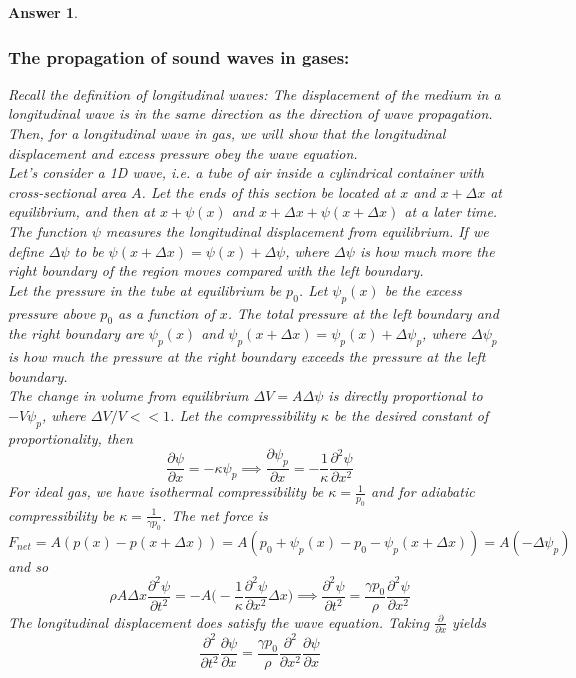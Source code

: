 \documentclass[a4paper]{article}
\newtheorem{ans}{Answer}[subsection]
\theoremstyle{new}
\begin{document}
\begin{ans}
\subsubsection*{The propagation of sound waves in gases:}
Recall the definition of longitudinal waves: The displacement of the medium in a longitudinal wave is in the same direction as the direction of wave propagation. Then, for a longitudinal wave in gas, we will show that the longitudinal displacement and excess pressure obey the wave equation.\\[5pt]
Let's consider a 1D wave, i.e. a tube of air inside a cylindrical container with cross-sectional area $A$. Let the ends of this section be located at $x$ and $x+\Delta x$ at equilibrium, and then at $x+\psi(x)$ and $x+\Delta x+\psi(x+\Delta x)$ at a later time. The function $\psi$ measures the longitudinal displacement from equilibrium. If we define $\Delta\psi$ to be $\psi(x+\Delta x)=\psi(x)+\Delta\psi$, where $\Delta\psi$ is how much more the right boundary of the region moves compared with the left boundary.\\[5pt]
Let the pressure in the tube at equilibrium be $p_0$. Let $\psi_p(x)$ be the excess pressure above $p_0$ as a function of $x$. The total pressure at the left boundary and the right boundary are $\psi_p(x)$ and $\psi_p(x+\Delta x)=\psi_p(x)+\Delta\psi_p$, where $\Delta\psi_p$ is how much the pressure at the right boundary exceeds the pressure at the left boundary.\\[5pt]
The change in volume from equilibrium $\Delta V=A\Delta\psi$ is directly proportional to $-V\psi_p$, where $\Delta V/V<<1$. Let the compressibility $\kappa$ be the desired constant of proportionality, then $$\frac{\partial\psi}{\partial x}=-\kappa\psi_p\implies\frac{\partial\psi_p}{\partial x}=-\frac{1}{\kappa}\frac{\partial^2\psi}{\partial x^2}$$
For ideal gas, we have isothermal compressibility be $\kappa=\frac{1}{p_0}$ and for adiabatic compressibility be $\kappa=\frac{1}{\gamma p_0}$. The net force is $F_{net}=A(p(x)-p(x+\Delta x))=A(p_0+\psi_p(x)-p_0-\psi_p(x+\Delta x))=A(-\Delta\psi_p)$ and so
$$\rho A\Delta x\frac{\partial^2\psi}{\partial t^2}=-A\bigg(-\frac{1}{\kappa}\frac{\partial^2\psi}{\partial x^2}\Delta x\bigg)\implies\frac{\partial^2\psi}{\partial t^2}=\frac{\gamma p_0}{\rho}\frac{\partial^2\psi}{\partial x^2}$$
The longitudinal displacement does satisfy the wave equation. Taking $\frac{\partial}{\partial x}$ yields $$\frac{\partial^2}{\partial t^2}\frac{\partial\psi}{\partial x}=\frac{\gamma p_0}{\rho}\frac{\partial^2}{\partial x^2}\frac{\partial\psi}{\partial x}$$

\end{ans}
\end{document}
